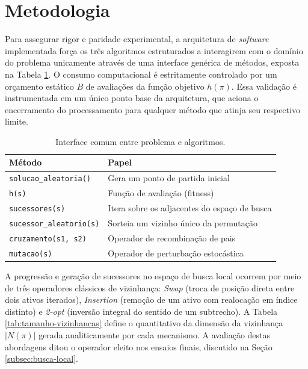 \section{Metodologia}
\label{sec:metodologia}

Para assegurar rigor e paridade experimental, a arquitetura de \textit{software} implementada força os três algoritmos estruturados a interagirem com o domínio do problema unicamente através de uma interface genérica de métodos, exposta na Tabela \ref{tab:interface}. O consumo computacional é estritamente controlado por um orçamento estático $B$ de avaliações da função objetivo $h(\pi)$. Essa validação é instrumentada em um único ponto base da arquitetura, que aciona o encerramento do processamento para qualquer método que atinja seu respectivo limite.

\begin{table}[H]
\centering
\caption{Interface comum entre problema e algoritmos.}
\label{tab:interface}
\begin{tabular}{ll}
\toprule
Método                          & Papel \\
\midrule
\texttt{solucao\_aleatoria()}   & Gera um ponto de partida inicial \\
\texttt{h(s)}                   & Função de avaliação (fitness) \\
\texttt{sucessores(s)}          & Itera sobre os adjacentes do espaço de busca \\
\texttt{sucessor\_aleatorio(s)} & Sorteia um vizinho único da permutação \\
\texttt{cruzamento(s1, s2)}     & Operador de recombinação de pais \\
\texttt{mutacao(s)}             & Operador de perturbação estocástica \\
\bottomrule
\end{tabular}
\end{table}

A progressão e geração de sucessores no espaço de busca local ocorrem por meio de três operadores clássicos de vizinhança: \textit{Swap} (troca de posição direta entre dois ativos iterados), \textit{Insertion} (remoção de um ativo com realocação em índice distinto) e \textit{2-opt} (inversão integral do sentido de um subtrecho). A Tabela \ref{tab:tamanho-vizinhancas} define o quantitativo da dimensão da vizinhança $|N(\pi)|$ gerada analiticamente por cada mecanismo. A avaliação destas abordagens ditou o operador eleito nos ensaios finais, discutido na Seção \ref{subsec:busca-local}.

